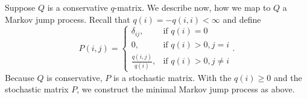 \documentclass[12pt,a4paper]{scrartcl}
\numberwithin{equation}{section}
\begin{document}
Suppose $Q$ is a conservative $q$-matrix. We describe now, how we map to $Q$ a Markov jump process.
Recall that $q\left(i\right) = -q\left(i,i\right) < \infty$ and define
\begin{equation} \label{eq:UebergangsmatrixembeddedChain}
P\left(i,j\right) =\begin{cases} \delta_{ij}, & \mbox{if }q\left(i\right)=0 \\ 0, & \mbox{if } q\left(i\right) >0, j = i \\ \frac{q\left(i,j\right)}{q\left(i\right)}, & \mbox{if } q\left(i\right) >0,j \neq i \end{cases}.
\end{equation}
Because $Q$ is conservative, $P$ is a stochastic matrix. With the $q\left(i\right)\geq 0$ and the stochastic matrix $P$, we construct the minimal Markov jump process as above.
\end{document}

